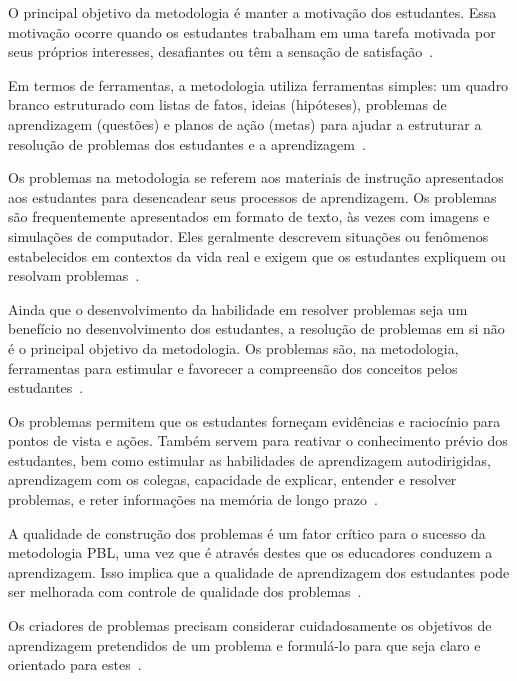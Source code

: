 O principal objetivo da metodologia é manter a motivação
dos estudantes.
Essa motivação ocorre quando os estudantes trabalham em
uma tarefa motivada por seus próprios interesses, desafiantes
ou têm a sensação de satisfação~\cite{hmelo2004problem}.

Em termos de ferramentas, a metodologia utiliza ferramentas simples:
um quadro branco estruturado com listas de fatos,
ideias (hipóteses), problemas de aprendizagem (questões)
e planos de ação (metas) para ajudar a estruturar a
resolução de problemas dos estudantes e a
aprendizagem~\cite{hmelo2004problem}. 

Os problemas na metodologia se referem aos materiais de instrução apresentados
aos estudantes para desencadear seus processos de aprendizagem.
Os problemas são frequentemente apresentados em formato de texto,
às vezes com imagens e simulações de computador.
Eles geralmente descrevem situações ou fenômenos estabelecidos
em contextos da vida real e exigem que os estudantes expliquem ou
resolvam problemas~\cite{hmelo2004problem}.

Ainda que o desenvolvimento da habilidade em resolver problemas seja um benefício
no desenvolvimento dos estudantes, a resolução de problemas em si não é o
principal objetivo da metodologia.
Os problemas são, na metodologia, ferramentas para estimular e
favorecer a compreensão dos conceitos pelos
estudantes~\cite{wood2003problem, amos1998problem}.

Os problemas permitem que os estudantes forneçam evidências
e raciocínio para pontos de vista e ações.
Também servem para reativar o conhecimento prévio dos
estudantes, bem como estimular as habilidades de aprendizagem
autodirigidas, aprendizagem com os colegas,
capacidade de explicar, entender e resolver problemas, e
reter informações na memória de longo
prazo~\cite{des1999delphi, azer2012twelve}.

A qualidade de construção dos problemas é um fator crítico para o
sucesso da metodologia \ac{PBL}, uma vez que é através destes
que os educadores conduzem a
aprendizagem.
Isso implica que a qualidade de aprendizagem dos estudantes
pode ser melhorada com controle de qualidade dos
problemas~\cite{santos2009analisa,des1999delphi,dolmans1997seven}.

Os criadores de problemas precisam considerar cuidadosamente
os objetivos de aprendizagem pretendidos de um problema
e formulá-lo para que seja claro e
orientado para estes~\cite{sockalingam2011student}.

